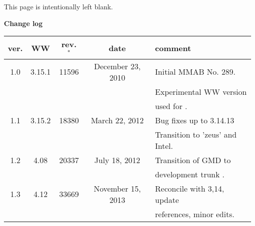 \documentclass[12pt]{article}
\newcommand{\pstyle}{plain}
\newcommand{\ww}{WAVEWATCH III}
\newcommand{\bpage}{\vfill \pagebreak \strut

\vspace{2.5in} \centerline{This page is intentionally left blank.}}
\begin{document}
\bpage

\pagebreak

\pagestyle{\pstyle}
\setcounter{page}{1}


\begin{abstract}
This report describes a genetic optimization package for the Generalized
Multiple DIA (GMD) in the \ww\ modeling framework. This report will be updated
as needed, depending upon development of this package or of the underlying
wave model.
\end{abstract}

\vspace{\baselineskip}
\vspace{\baselineskip}

\begin{center}
{\bf Change log} \\
\vspace{\baselineskip}
\begin{tabular}{|c|c|c|c|l|} \hline
ver. &   WW   & rev. $^*$   & date    & comment    \\ \hline \hline
 1.0 & 3.15.1 &  11596 & December 23, 2010 & Initial MMAB No. 289.          \\
     &        &        &                   & Experimental WW version        \\
     &        &        &                   & used for \cite{tol:MMAB10d}.   \\ \hline
 1.1 & 3.15.2 &  18380 &  March 22, 2012   & Bug fixes up to 3.14.13        \\
     &        &        &                   & Transition to 'zeus' and Intel.\\ \hline
 1.2 &  4.08  &  20337 &  July 18, 2012    & Transition of GMD to           \\
     &        &        &                   & development trunk .            \\ \hline 
 1.3 &  4.12  &  33669 & November 15, 2013 & Reconcile with 3,14, update    \\
     &        &        &                   & references, minor edits.       \\ \hline 
\end{tabular}
\end{center}
\end{document}
